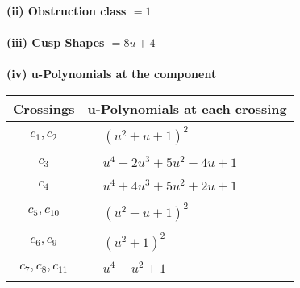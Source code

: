 \documentclass[1p]{elsarticle_modified}
\theoremstyle{definition}
\begin{document}
\flushleft \textbf{(ii) Obstruction class $= 1$}\\~\\
\flushleft \textbf{(iii) Cusp Shapes $= 8 u+4$}\\~\\
\newpage\renewcommand{\arraystretch}{1}
\flushleft \textbf{(iv) u-Polynomials at the component}\newline \\
\begin{tabular}{m{50pt}|m{274pt}}
Crossings & \hspace{64pt}u-Polynomials at each crossing \\
\hline $$\begin{aligned}c_{1},c_{2}\end{aligned}$$&$\begin{aligned}
&(u^2+u+1)^2
\end{aligned}$\\
\hline $$\begin{aligned}c_{3}\end{aligned}$$&$\begin{aligned}
&u^4-2 u^3+5 u^2-4 u+1
\end{aligned}$\\
\hline $$\begin{aligned}c_{4}\end{aligned}$$&$\begin{aligned}
&u^4+4 u^3+5 u^2+2 u+1
\end{aligned}$\\
\hline $$\begin{aligned}c_{5},c_{10}\end{aligned}$$&$\begin{aligned}
&(u^2- u+1)^2
\end{aligned}$\\
\hline $$\begin{aligned}c_{6},c_{9}\end{aligned}$$&$\begin{aligned}
&(u^2+1)^2
\end{aligned}$\\
\hline $$\begin{aligned}c_{7},c_{8},c_{11}\end{aligned}$$&$\begin{aligned}
&u^4- u^2+1
\end{aligned}$\\
\hline
\end{tabular}\\~\\
\end{document}
